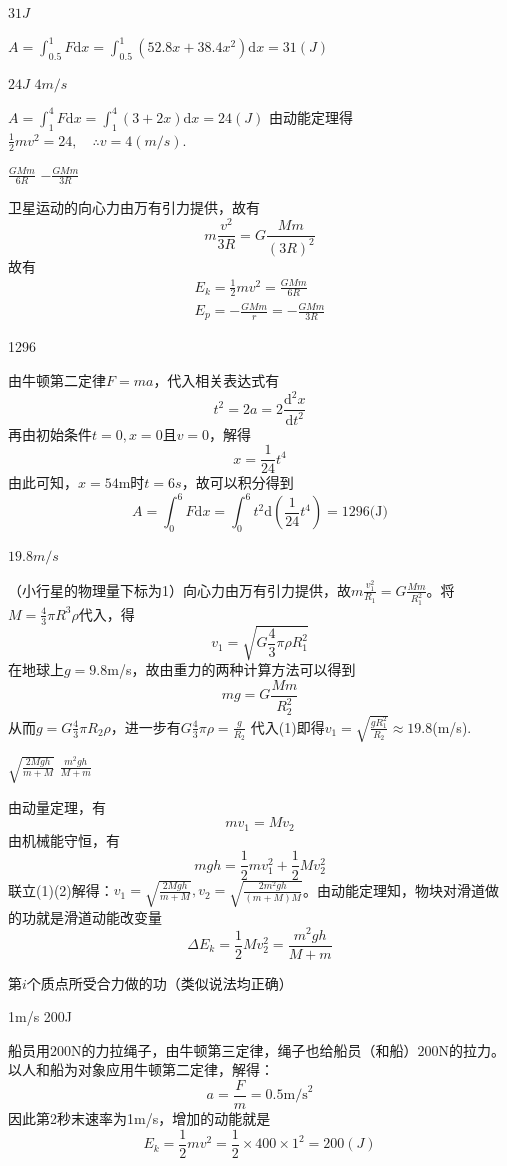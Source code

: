 \documentclass[b5paper,opensource,sourcefont,parskip]{qyxf-book}
\newcommand{\di}[1]{\mathrm{d}#1}
\newcommand{\ddy}[2]{\frac{\mathrm{d} ^2 #1}{\mathrm{d} #2 ^2}}
\begin{document}
$31J$

\solve $A=\int_{0.5}^{1}F\di{x}=\int_{0.5}^{1}(52.8x+38.4x^2)\di{x}=31(J)$

$24J$ $4m/s$

\solve $A=\int_{1}^{4}F\di{x}=\int_{1}^{4}(3+2x)\di{x}=24(J)$
由动能定理得$\frac{1}{2}mv^2=24,\quad \therefore v=4(m/s)$.

$\frac{GMm}{6R}$ \qquad $-\frac{GMm}{3R}$

\solve 卫星运动的向心力由万有引力提供，故有
\[m\frac{v^2}{3R}=G\frac{Mm}{(3R)^2}\]
故有
\begin{gather*}
E_k=\frac{1}{2}mv^2=\frac{GMm}{6R}\\
E_p=-\frac{GMm}{r}=-\frac{GMm}{3R}
\end{gather*}

1296

\solve
由牛顿第二定律$F=ma$，代入相关表达式有
\[t^2=2a=2\ddy{x}{t}\]
再由初始条件$t=0,x=0$且$v=0$，解得
\[x=\frac{1}{24}t^4\]
由此可知，$x=54$m时$t=6s$，故可以积分得到
\[A=\int_{0}^{6}F\di{x}=\int_{0}^{6}t^2\di{(\frac{1}{24}t^4)}=1296\text{(J)}\]


$19.8m/s$

\solve
（小行星的物理量下标为1）向心力由万有引力提供，故$m\frac{v_1^2}{R_1}=G\frac{Mm}{R_1^2}$。将$M=\frac{4}{3}\pi R^3\rho$代入，得
\[v_1=\sqrt{G\frac{4}{3}\pi\rho R_1^2}\]
在地球上$g=9.8$m/s，故由重力的两种计算方法可以得到
\[mg=G\frac{Mm}{R_2^2}\]
从而$g=G\frac{4}{3}\pi R_2\rho$，进一步有$G\frac{4}{3}\pi\rho=\frac{g}{R_2}$
代入(1)即得$v_1=\sqrt{\frac{gR_1^2}{R_2}}\approx19.8$(m/s).

 $\sqrt{\frac{2Mgh}{m+M}}$ \qquad $\frac{m^2gh}{M+m}$

\solve 由动量定理，有
\begin{equation}
mv_1=Mv_2
\end{equation}
由机械能守恒，有
\begin{equation}
mgh=\frac{1}{2}mv_1^2+\frac{1}{2}Mv_2^2
\end{equation}
联立(1)(2)解得：$v_1=\sqrt{\frac{2Mgh}{m+M}}
,v_2=\sqrt{\frac{2m^2gh}{(m+M)M}}$。由动能定理知，物块对滑道做的功就是滑道动能改变量
\[\Delta E_k=\frac{1}{2}Mv_2^2=\frac{m^2gh}{M+m}\]

 第$i$个质点所受合力做的功（类似说法均正确）

1m/s \qquad 200J

\solve 船员用$200$N的力拉绳子，由牛顿第三定律，绳子也给船员（和船）$200$N的拉力。以人和船为对象应用牛顿第二定律，解得：
\[a=\frac{F}{m}=0.5\text{m/s}^2\]
因此第2秒末速率为1m/s，增加的动能就是
\[E_k=\frac{1}{2}mv^2=\frac{1}{2}\times400\times1^2=200(J)\]
\end{document}
